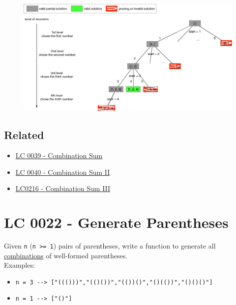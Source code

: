 \begin{figure}[H]
	\centering
	\includegraphics[width=1.0\linewidth]{images/lc0216_pst}
	\label{fig:lc0216pst}
\end{figure}

\subsection*{Related}
\begin{itemize}
	\item \hyperref[lc0039]{LC 0039 - Combination Sum}
	\item \hyperref[lc0040]{LC 0040 - Combination Sum II}
	\item \hyperref[lc0216]{LC0216 - Combination Sum III}
\end{itemize}

\section{LC 0022 - Generate Parentheses}
Given {\colorbox{CodeBackground}{\lstinline|n|}} ({\colorbox{CodeBackground}{\lstinline|n >= 1|}}) pairs of parentheses, write a function to generate all \ul{combinations} of well-formed parentheses.\\

Examples:
\begin{itemize}
	\item {\colorbox{CodeBackground}{\lstinline|n = 3 --> ["((()))","(()())","(())()","()(())","()()()"]|}}
	\item {\colorbox{CodeBackground}{\lstinline|n = 1 --> ["()"]|}}
\end{itemize}

